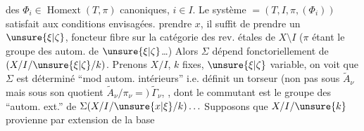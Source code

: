 des $\Phi_i\in\operatorname{Homext}(T,\pi)$ canoniques,
$i\in I$. Le système
$=(T,I,\pi,(\Phi_i))$
satisfait aux conditions envisagées. 
 
 prendre $x$, il suffit
de prendre un $\unsure{\xi|\zeta}$, foncteur fibre sur
la catégorie des rev. étales de $X\setminus I$
($\pi$ étant le groupe des autom. de $\unsure{\xi|\zeta}$\ldots)
Alors $\Sigma$ dépend fonctoriellement de
$(X/I/\unsure{\xi|\zeta}/k)$. Prenons $X/I$, $k$ fixes,
$\unsure{\xi|\zeta}$ variable, on voit que $\Sigma$ est déterminé
``mod autom. intérieurs'' i.e. 
définit un torseur  (non pas
sous $\widetilde A_\nu$ mais sous son quotient
$\widetilde A_\nu/\pi_\nu=)\ \widetilde\Gamma_\nu$,
,
dont le commutant est le groupe
des ``autom. ext.'' de 
$\Sigma(X/I/\unsure{x|\xi}/k)\ldots$
Supposons que $X/I/\unsure{k}$ provienne
par extension de la base
